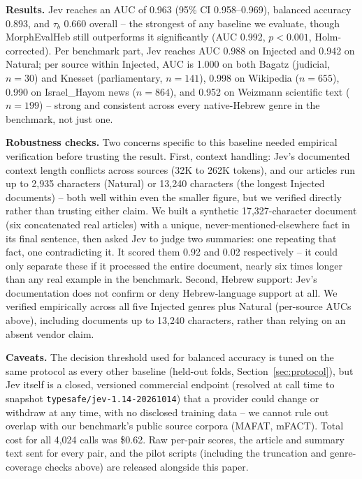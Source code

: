 \documentclass[11pt]{article}
\begin{document}
\textbf{Results.} Jev reaches an AUC of 0.963 (95\% CI 0.958--0.969), balanced accuracy 0.893, and $\tau_b$ 0.660 overall -- the strongest of any baseline we evaluate, though MorphEvalHeb still outperforms it significantly (AUC 0.992, $p<0.001$, Holm-corrected). Per benchmark part, Jev reaches AUC 0.988 on Injected and 0.942 on Natural; per source within Injected, AUC is 1.000 on both Bagatz (judicial, $n{=}30$) and Knesset (parliamentary, $n{=}141$), 0.998 on Wikipedia ($n{=}655$), 0.990 on Israel\_Hayom news ($n{=}864$), and 0.952 on Weizmann scientific text ($n{=}199$) -- strong and consistent across every native-Hebrew genre in the benchmark, not just one.

\textbf{Robustness checks.} Two concerns specific to this baseline needed empirical verification before trusting the result. First, context handling: Jev's documented context length conflicts across sources (32K to 262K tokens), and our articles run up to 2,935 characters (Natural) or 13,240 characters (the longest Injected documents) -- both well within even the smaller figure, but we verified directly rather than trusting either claim. We built a synthetic 17,327-character document (six concatenated real articles) with a unique, never-mentioned-elsewhere fact in its final sentence, then asked Jev to judge two summaries: one repeating that fact, one contradicting it. It scored them 0.92 and 0.02 respectively -- it could only separate these if it processed the entire document, nearly six times longer than any real example in the benchmark. Second, Hebrew support: Jev's documentation does not confirm or deny Hebrew-language support at all. We verified empirically across all five Injected genres plus Natural (per-source AUCs above), including documents up to 13,240 characters, rather than relying on an absent vendor claim.

\textbf{Caveats.} The decision threshold used for balanced accuracy is tuned on the same protocol as every other baseline (held-out folds, Section~\ref{sec:protocol}), but Jev itself is a closed, versioned commercial endpoint (resolved at call time to snapshot \texttt{typesafe/jev-1.14-20261014}) that a provider could change or withdraw at any time, with no disclosed training data -- we cannot rule out overlap with our benchmark's public source corpora (MAFAT, mFACT). Total cost for all 4,024 calls was \$0.62. Raw per-pair scores, the article and summary text sent for every pair, and the pilot scripts (including the truncation and genre-coverage checks above) are released alongside this paper.
\end{document}

